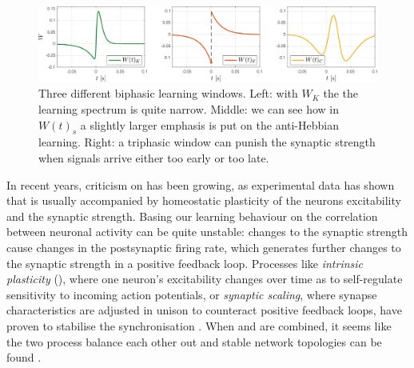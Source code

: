 \begin{figure}[H]
\centering
\includegraphics[width = \textwidth]{../Figures/Learning/LearningWindows.pdf}
\caption{Three different biphasic learning windows. Left: with $W_K$ the the learning spectrum is quite narrow. Middle: we can see how in $W(t)_s$ a slightly larger emphasis is put on the anti-Hebbian learning. Right: a triphasic window can punish the synaptic strength when signals arrive either too early or too late.}
\label{fig:LearningWindows}
\end{figure}


In recent years, criticism on \STDP has been growing, as experimental data has shown that \STDP is usually accompanied by homeostatic plasticity of the neurons excitability and the synaptic strength. Basing our learning behaviour on the correlation between neuronal activity can be quite unstable: changes to the synaptic strength cause changes in the postsynaptic firing rate, which generates further changes to the synaptic strength in a positive feedback loop. Processes like \textsl{intrinsic plasticity} (\IP), where one neuron's excitability changes over time as to self-regulate sensitivity to incoming action potentials, or \textsl{synaptic scaling}, where synapse characteristics are adjusted in unison to counteract positive feedback loops, have proven to stabilise the synchronisation \cite{ChrolCannon2014, Kirkwood2019}. When \STDP and \IP are combined, it seems like the two process balance each other out and stable network topologies can be found \cite{Song2017}.


